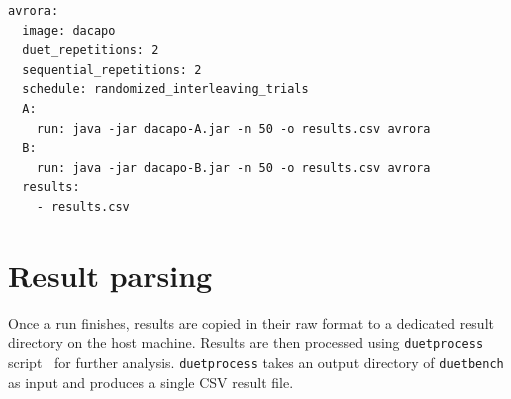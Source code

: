 \begin{listing}[!ht]
    \begin{lstlisting}
avrora:
  image: dacapo
  duet_repetitions: 2
  sequential_repetitions: 2
  schedule: randomized_interleaving_trials
  A:
    run: java -jar dacapo-A.jar -n 50 -o results.csv avrora
  B:
    run: java -jar dacapo-B.jar -n 50 -o results.csv avrora
  results:
    - results.csv
    \end{lstlisting}
    \caption{
        Example part of YAML configuration file for \lstinline{duetbench} that runs \lstinline{avrora} benchmark from the DaCapo suite.
        In this case, both A and B versions are packaged in a single container image as Java JAR archives.
        Run command specifies how to invoke the DaCapo harness --- 50 iterations, results in \lstinline{results.csv} and run only \lstinline{avrora} benchmark.
        All the result files or directories need to be specified in \lstinline{results} array field.
        Note the correspondence between user input fields from this configuration and parameters in angled brackets from~\cref{fig:duetbench_sequence}.
        Furthermore, users can specify the number of repetitions for both asynchronous duet and sequential measurements, as well as the scheduling strategy for those runs.
    }
    \label{lst:config}
\end{listing}

\section{Result parsing}
\label{sec:result_parsing}

Once a run finishes, results are copied in their raw format to a dedicated result directory on the host machine.
Results are then processed using \lstinline{duetprocess} script~\cite{wiki} for further analysis.
\lstinline{duetprocess} takes an output directory of \lstinline{duetbench} as input and produces a single CSV result file.

